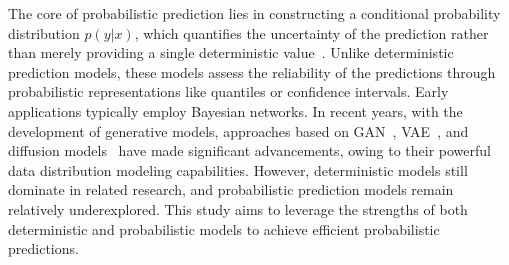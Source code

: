 The core of probabilistic prediction lies in constructing a conditional probability distribution \( p(y|x) \), which quantifies the uncertainty of the prediction rather than merely providing a single deterministic value~\cite{yang2024survey,tashiro2021csdi}. Unlike deterministic prediction models, these models 
assess the reliability of the predictions through probabilistic representations like quantiles or confidence intervals. Early applications typically employ Bayesian networks. In recent years, with the development of generative models, approaches based on GAN~\cite{jin2022gan,saxena2019d,zhang2021satp}, VAE~\cite{chen2021learning,de2022vehicles,zhou2020variational}, and diffusion models~\cite{tashiro2021csdi,chai2024diffusion,lin2024diffusion} have made significant advancements, owing to their powerful data distribution modeling capabilities. However, deterministic models still dominate in related research, and probabilistic prediction models remain relatively underexplored. This study aims to leverage the strengths of both deterministic and probabilistic models to achieve efficient probabilistic predictions.